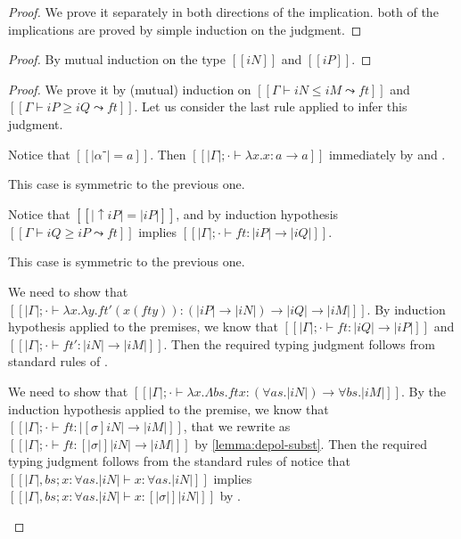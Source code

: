 \lemmaElabRemovable*
\begin{proof}
  We prove it separately in both directions of the implication.
  both of the implications are proved by simple induction on the judgment.
\end{proof}

\lemmaDepolSubst*
\begin{proof}
  By mutual induction on the type $[[iN]]$ and $[[iP]]$.
\end{proof}

\lemmaSubtElabSoundness*
\begin{proof}
  We prove it by (mutual) induction on $[[Γ ⊢ iN ≤ iM ⤳ ft]]$ and 
  $[[Γ ⊢ iP ≥ iQ ⤳ ft]]$.
  Let us consider the last rule applied to infer this judgment.
  \begin{caseof}
    \item {} 
      Notice that $[[|α⁻| = a]]$. Then
      $[[|Γ| ; · ⊢ λx.x : a → a]]$ immediately by 
       and .

    \item {}
      This case is symmetric to the previous one.

    \item {}
      Notice that $[[|↑iP| = |iP|]]$,
      and by induction hypothesis $[[Γ ⊢ iQ ≥ iP ⤳ ft]]$ implies 
      $[[|Γ| ; · ⊢ ft : |iP| → |iQ|]]$.

    \item {}
      This case is symmetric to the previous one.

    \item {}
      We need to show that 
      $[[|Γ|; · ⊢ λx. λy. ft' (x (ft y)) : (|iP| → |iN|) → |iQ| → |iM|]]$.
      By induction hypothesis applied to the premises, we know that 
      $[[|Γ|; · ⊢ ft : |iQ| → |iP|]]$ and 
      $[[|Γ|; · ⊢ ft' : |iN| → |iM|]]$.
      Then the required typing judgment follows from
      standard rules of \systemf.

    \item {}
      We need to show that 
      $[[|Γ|; · ⊢ λx. Λbs. ft x : (∀as.|iN|) → ∀bs.|iM|]]$.
      By the induction hypothesis applied to the premise, 
      we know that $[[|Γ|; · ⊢ ft : |[σ]iN| → |iM|]]$, 
      that we rewrite as $[[|Γ|; · ⊢ ft : [|σ|]|iN| → |iM|]]$
      by \cref{lemma:depol-subst}.
      Then the required typing judgment follows from
      the standard rules of \systemf
      notice that 
      $[[|Γ|, bs; x : ∀as.|iN|  ⊢ x : ∀as.|iN|]]$
      implies 
      $[[|Γ|, bs; x : ∀as.|iN|  ⊢ x : [|σ|]|iN|]]$ by
      .


\end{caseof}
\end{proof}
